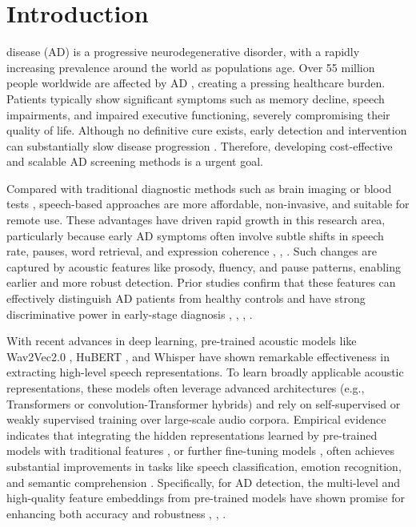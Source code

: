 \documentclass[journal]{IEEEtran}
\begin{document}
\IEEEpeerreviewmaketitle



\section{Introduction}
\label{sec:intro}

 disease (AD) is a progressive neurodegenerative disorder, with a rapidly increasing prevalence around the world as populations age.
Over 55 million people worldwide are affected by AD \cite{5000W_AD}, creating a pressing healthcare burden.
Patients typically show significant symptoms such as memory decline, speech impairments, and impaired executive functioning, severely compromising their quality of life.\cite{Symptons}%
Although no definitive cure exists, early detection and intervention can substantially slow disease progression \cite{EarlyDiagnosis1,EarlyDiagnosis2}.
Therefore, developing cost-effective and scalable AD screening methods is a urgent goal.


Compared with traditional diagnostic methods such as brain imaging or blood tests \cite{Detect_Method}, speech-based approaches are more affordable, non-invasive, and suitable for remote use. These advantages have driven rapid growth in this research area, particularly because early AD symptoms often involve subtle shifts in speech rate, pauses, word retrieval, and expression coherence \cite{speakfeature-AD1}, \cite{speakfeature-AD2}, \cite{speakfeature-AD3}. 
Such changes are captured by acoustic features like prosody, fluency, and pause patterns, enabling earlier and more robust detection. Prior studies confirm that these features can effectively distinguish AD patients from healthy controls and have strong discriminative power in early-stage diagnosis \cite{egemaps-luwen}, \cite{traditional1}, \cite{traditional2}, \cite{traditional3}.



With recent advances in deep learning, pre-trained acoustic models like Wav2Vec2.0 \cite{Wav2Vec}, HuBERT \cite{Hubert}, and Whisper \cite{openai-Whisper} have shown remarkable effectiveness in extracting high-level speech representations.
To learn broadly applicable acoustic representations, these models often leverage advanced architectures (e.g., Transformers or convolution-Transformer hybrids) and rely on self-supervised or weakly supervised training over large-scale audio corpora.
Empirical evidence indicates that integrating the hidden representations learned by pre-trained models with traditional features \cite{luz24}, or further fine-tuning models \cite{whipser-transfer}, often achieves substantial improvements in tasks like speech classification, emotion recognition, and semantic comprehension \cite{w2v-cls}.
Specifically, for AD detection, the multi-level and high-quality feature embeddings from pre-trained models have shown promise for enhancing both accuracy and robustness \cite{other-Hubert-w2v-embedding1}, \cite{other-Hubert-w2v-embedding2}, \cite{other-Hubert-w2v-embedding3}.
\end{document}
